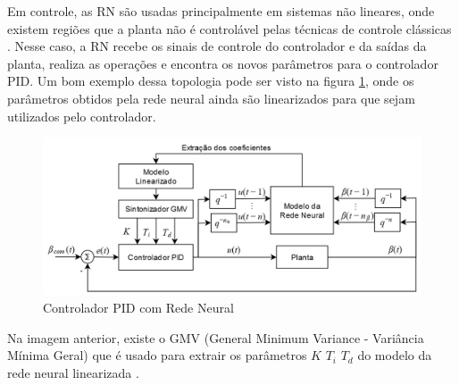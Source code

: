 Em controle, as RN são usadas principalmente em sistemas não lineares, onde existem regiões que a planta não é controlável pelas técnicas de controle clássicas . Nesse caso, a RN recebe os sinais de controle do controlador e da saídas da planta, realiza as operações e encontra os novos parâmetros para o controlador PID. Um bom exemplo dessa topologia pode ser visto na figura \ref{fig:pid_neural_chen_p212}, onde os parâmetros obtidos pela rede neural ainda são linearizados para que sejam utilizados pelo controlador.

\begin{figure}[H]
  \caption{Controlador PID com Rede Neural}
  \begin{center}
      \includegraphics[scale=0.55]{img/pid_neural_chen_p212}
  \end{center}
  \label{fig:pid_neural_chen_p212}
\end{figure}

Na imagem anterior, existe o GMV (General Minimum Variance - Variância Mínima Geral) que é usado para extrair os parâmetros $K$ $T_i$ $T_d$ do modelo da rede neural linearizada .


